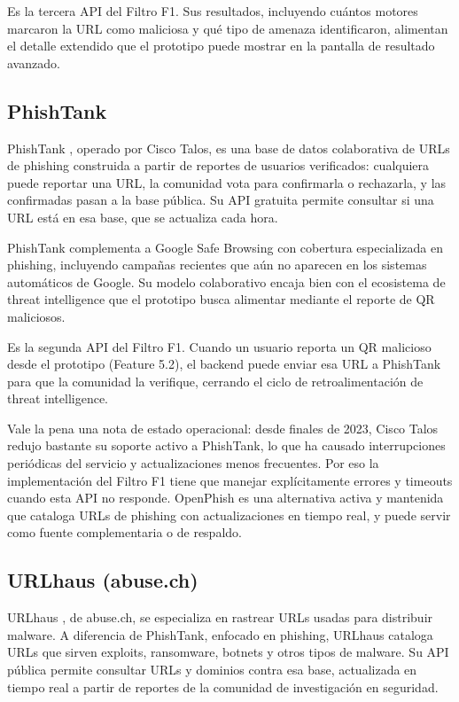 Es la tercera API del Filtro F1. Sus resultados, incluyendo cu\'antos motores marcaron la URL como maliciosa y qu\'e tipo de amenaza identificaron, alimentan el detalle extendido que el prototipo puede mostrar en la pantalla de resultado avanzado.

\subsection{PhishTank}

PhishTank \cite{phishtank_devinfo}, operado por Cisco Talos, es una base de datos colaborativa de URLs de phishing construida a partir de reportes de usuarios verificados: cualquiera puede reportar una URL, la comunidad vota para confirmarla o rechazarla, y las confirmadas pasan a la base p\'ublica. Su API gratuita permite consultar si una URL est\'a en esa base, que se actualiza cada hora.

PhishTank complementa a Google Safe Browsing con cobertura especializada en phishing, incluyendo campa\~nas recientes que a\'un no aparecen en los sistemas autom\'aticos de Google. Su modelo colaborativo encaja bien con el ecosistema de threat intelligence que el prototipo busca alimentar mediante el reporte de QR maliciosos.

Es la segunda API del Filtro F1. Cuando un usuario reporta un QR malicioso desde el prototipo (Feature 5.2), el backend puede enviar esa URL a PhishTank para que la comunidad la verifique, cerrando el ciclo de retroalimentaci\'on de threat intelligence.

Vale la pena una nota de estado operacional: desde finales de 2023, Cisco Talos redujo bastante su soporte activo a PhishTank, lo que ha causado interrupciones peri\'odicas del servicio y actualizaciones menos frecuentes. Por eso la implementaci\'on del Filtro F1 tiene que manejar expl\'icitamente errores y timeouts cuando esta API no responde. OpenPhish \cite{openphish} es una alternativa activa y mantenida que cataloga URLs de phishing con actualizaciones en tiempo real, y puede servir como fuente complementaria o de respaldo.

\subsection{URLhaus (abuse.ch)}

URLhaus \cite{urlhaus_api}, de abuse.ch, se especializa en rastrear URLs usadas para distribuir malware. A diferencia de PhishTank, enfocado en phishing, URLhaus cataloga URLs que sirven exploits, ransomware, botnets y otros tipos de malware. Su API p\'ublica permite consultar URLs y dominios contra esa base, actualizada en tiempo real a partir de reportes de la comunidad de investigaci\'on en seguridad.

